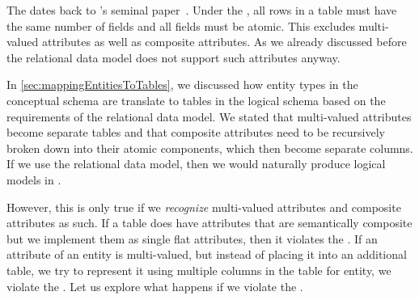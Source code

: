 %
\label{sec:normalForm:1}%
%
The  dates back to \citeauthor{C1970ARMODFLSDB}'s seminal paper~\cite{C1970ARMODFLSDB}.
Under the , all rows in a table must have the same number of fields and all fields must be atomic.
This excludes multi-valued attributes as well as composite attributes.
As we already discussed before the relational data model does not support such attributes anyway.

In \cref{sec:mappingEntitiesToTables}, we discussed how entity types in the conceptual schema are translate to tables in the logical schema based on the requirements of the relational data model.
We stated that multi-valued attributes become separate tables and that composite attributes need to be recursively broken down into their atomic components, which then become separate columns.
If we use the relational data model, then we would naturally produce logical models in .

However, this is only true if we \emph{recognize} multi-valued attributes and composite attributes as such.
If a table does have attributes that are semantically composite but we implement them as single flat attributes, then it violates the .
If an attribute of an entity is multi-valued, but instead of placing it into an additional table, we try to represent it using multiple columns in the table for entity, we violate the .
Let us explore what happens if we violate the .%
%
\FloatBarrier%
%
%
\FloatBarrier%
\endhsection%
%
